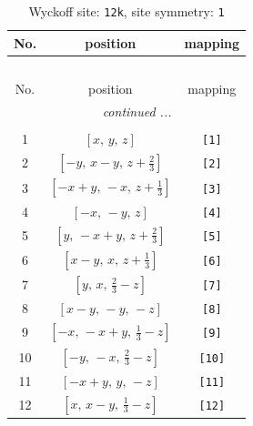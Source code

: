 \documentclass[fleqn,8pt]{jsarticle}
\begin{document}
\renewcommand{\arraystretch}{1.2}
\begin{longtable}{ccc}
\caption{Wyckoff site: {\tt 12k}, site symmetry: {\tt 1}}
 \\
 \hline \hline
No. & position & mapping \\ \hline \endfirsthead

\multicolumn{2}{l}{\tablename\ \thetable{}} \\
 \hline \hline
No. & position & mapping \\ \hline \endhead

 \hline \hline
\multicolumn{2}{r}{\footnotesize\it continued ...} \\ \endfoot

 \hline \hline
\multicolumn{2}{r}{} \\ \endlastfoot

1 & $\left[ x,\, y,\, z \right]$ & {\tt [1]} \\ \hline
2 & $\left[ - y,\, x - y,\, z + \frac{2}{3} \right]$ & {\tt [2]} \\ \hline
3 & $\left[ - x + y,\, - x,\, z + \frac{1}{3} \right]$ & {\tt [3]} \\ \hline
4 & $\left[ - x,\, - y,\, z \right]$ & {\tt [4]} \\ \hline
5 & $\left[ y,\, - x + y,\, z + \frac{2}{3} \right]$ & {\tt [5]} \\ \hline
6 & $\left[ x - y,\, x,\, z + \frac{1}{3} \right]$ & {\tt [6]} \\ \hline
7 & $\left[ y,\, x,\, \frac{2}{3} - z \right]$ & {\tt [7]} \\ \hline
8 & $\left[ x - y,\, - y,\, - z \right]$ & {\tt [8]} \\ \hline
9 & $\left[ - x,\, - x + y,\, \frac{1}{3} - z \right]$ & {\tt [9]} \\ \hline
10 & $\left[ - y,\, - x,\, \frac{2}{3} - z \right]$ & {\tt [10]} \\ \hline
11 & $\left[ - x + y,\, y,\, - z \right]$ & {\tt [11]} \\ \hline
12 & $\left[ x,\, x - y,\, \frac{1}{3} - z \right]$ & {\tt [12]} \\
\end{longtable}
\end{document}
